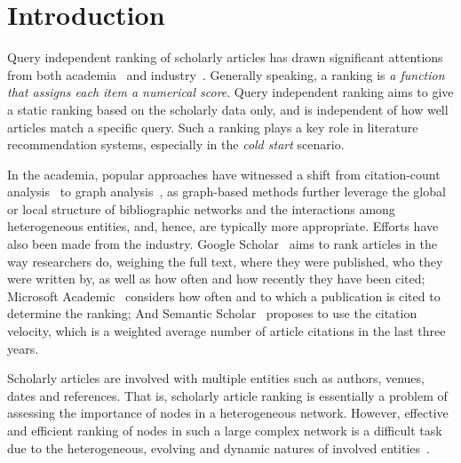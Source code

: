 \section{Introduction}
\label{sec-intro}

Query independent ranking of scholarly articles has drawn significant attentions from both academia~\cite{Garfield471,Hirsch15112005,Liang16AAAI,Jiang12-MRank,Waltman2014,Wang16TIST,Ng11KDD,Li08TSRanking,
Wang13AAAI,sayyadi09,WalkerXKM07} and industry~\cite{g-scholar,Sinha15:MAG,sem-scholar}.
Generally speaking, a ranking is {\em a function that assigns each item a numerical score}. Query independent ranking aims to give a static ranking based on the scholarly  data only, and is independent of how well articles match a specific query. Such a ranking plays a key role in literature recommendation systems, especially in the {\em cold start} scenario.

In the academia, popular approaches have witnessed a shift from citation-count analysis~\cite{Garfield471,Hirsch15112005} to graph analysis~\cite{Liang16AAAI,Jiang12-MRank,Waltman2014,Wang16TIST,Ng11KDD,Li08TSRanking,Wang13AAAI,sayyadi09,WalkerXKM07}, as graph-based methods further leverage the global or local structure of bibliographic networks and  the interactions among heterogeneous entities, and, hence, are typically more appropriate.
%
Efforts have also been made from the industry. Google Scholar~\cite{g-scholar} aims to rank articles in the way researchers do, weighing the full text, where they were published, who they were written by, as well as how often and how recently they have been cited; Microsoft Academic~\cite{Sinha15:MAG} considers how often and to which a publication is cited to determine the ranking; And
Semantic Scholar~\cite{sem-scholar} proposes to use the citation velocity, which is a weighted average number of article citations in the last three years.




Scholarly articles are involved with multiple entities such as authors, venues, dates and references. That is, scholarly article ranking is essentially a problem of assessing the importance of nodes in a heterogeneous network.
However, effective and efficient ranking of nodes in such a large complex network is a difficult task due to the heterogeneous, evolving and dynamic natures of involved entities~\cite{AggarwalS14-survey,fcs-biggraph}.


